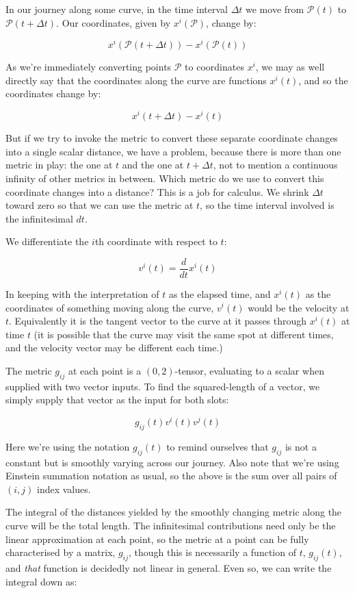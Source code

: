 In our journey along some curve, in the time interval $\Delta t$ we move from $\mathcal{P}(t)$ to $\mathcal{P}(t + \Delta t)$. Our coordinates, given by $x^i(\mathcal{P})$, change by:

$$
x^i(\mathcal{P}(t + \Delta t))
-
x^i(\mathcal{P}(t))
$$

As we're immediately converting points $\mathcal{P}$ to coordinates $x^i$, we may as well directly say that the coordinates along the curve are functions $x^i(t)$, and so the coordinates change by:

$$
x^i(t + \Delta t)
-
x^i(t)
$$

But if we try to invoke the metric to convert these separate coordinate changes into a single scalar distance, we have a problem, because there is more than one metric in play: the one at $t$ and the one at $t + \Delta t$, not to mention a continuous infinity of other metrics in between. Which metric do we use to convert this coordinate changes into a distance? This is a job for calculus. We shrink $\Delta t$ toward zero so that we can use the metric at $t$, so the time interval involved is the infinitesimal $dt$.

We differentiate the $i$th coordinate with respect to $t$:

$$
v^i(t) = \frac{d}{dt} x^i(t)
$$

In keeping with the interpretation of $t$ as the elapsed time, and $x^i(t)$ as the coordinates of something moving along the curve, $v^i(t)$ would be the velocity at $t$. Equivalently it is the tangent vector to the curve at it passes through $x^i(t)$ at time $t$ (it is possible that the curve may visit the same spot at different times, and the velocity vector may be different each time.)

The metric $g_{ij}$ at each point is a $(0, 2)$-tensor, evaluating to a scalar when supplied with two vector inputs. To find the squared-length of a vector, we simply supply that vector as the input for both slots:

$$
g_{ij}(t)
 v^i(t)  
 v^j(t) 
$$

Here we're using the notation $g_{ij}(t)$ to remind ourselves that $g_{ij}$ is not a constant but is smoothly varying across our journey. Also note that we're using Einstein summation notation as usual, so the above is the sum over all pairs of $(i, j)$ index values.

The integral of the distances yielded by the smoothly changing metric along the curve will be the total length. The infinitesimal contributions need only be the linear approximation at each point, so the metric at a point can be fully characterised by a matrix, $g_{ij}$, though this is necessarily a function of $t$, $g_{ij}(t)$, and \textit{that} function is decidedly not linear in general. Even so, we can write the integral down as:

